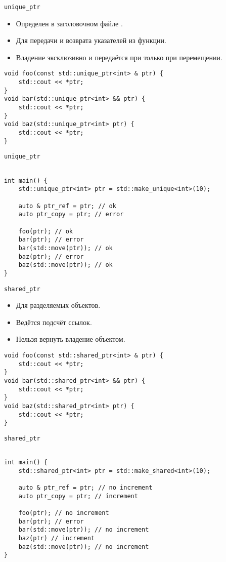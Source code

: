 \documentclass{beamer}
\begin{document}
\begin{frame}[fragile]{\texttt{unique\_ptr}}
    \small
    \begin{itemize}
        \item Определен в заголовочном файле .
        \item Для передачи и возврата указателей из функции.
        \item Владение эксклюзивно и передаётся при только при перемещении.
    \end{itemize}
        \begin{lstlisting}
void foo(const std::unique_ptr<int> & ptr) {
    std::cout << *ptr;
}
void bar(std::unique_ptr<int> && ptr) {
    std::cout << *ptr;
}
void baz(std::unique_ptr<int> ptr) {
    std::cout << *ptr;
}
        \end{lstlisting}
\end{frame}

\begin{frame}[fragile]{\texttt{unique\_ptr}}
    \begin{lstlisting}

int main() {
    std::unique_ptr<int> ptr = std::make_unique<int>(10);

    auto & ptr_ref = ptr; // ok
    auto ptr_copy = ptr; // error

    foo(ptr); // ok
    bar(ptr); // error
    bar(std::move(ptr)); // ok
    baz(ptr); // error
    baz(std::move(ptr)); // ok
}
    \end{lstlisting}
\end{frame}


\begin{frame}[fragile]{\texttt{shared\_ptr}}
    \small
    \begin{itemize}
        \item Для разделяемых объектов.
        \item Ведётся подсчёт ссылок.
        \item Нельзя вернуть владение объектом.
    \end{itemize}
        \begin{lstlisting}
void foo(const std::shared_ptr<int> & ptr) {
    std::cout << *ptr;
}
void bar(std::shared_ptr<int> && ptr) {
    std::cout << *ptr;
}
void baz(std::shared_ptr<int> ptr) {
    std::cout << *ptr;
}
        \end{lstlisting}
\end{frame}

\begin{frame}[fragile]{\texttt{shared\_ptr}}
    \begin{lstlisting}

int main() {
    std::shared_ptr<int> ptr = std::make_shared<int>(10);

    auto & ptr_ref = ptr; // no increment
    auto ptr_copy = ptr; // increment

    foo(ptr); // no increment
    bar(ptr); // error
    bar(std::move(ptr)); // no increment
    baz(ptr) // increment
    baz(std::move(ptr)); // no increment
}
    \end{lstlisting}
\end{frame}
\end{document}
